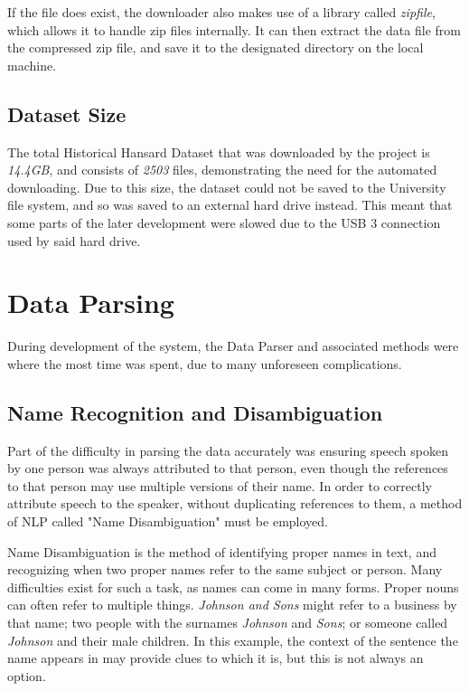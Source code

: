 If the file does exist, the downloader also makes use of a library called \emph{zipfile}, which allows it to handle zip files internally. It can then extract the data file from the compressed zip file, and save it to the designated directory on the local machine.

\subsection{Dataset Size}
\label{sec:imp_dataset_size}

The total Historical Hansard Dataset that was downloaded by the project is \emph{14.4GB}, and consists of \emph{2503} files, demonstrating the need for the automated downloading. Due to this size, the dataset could not be saved to the University file system, and so was saved to an external hard drive instead. This meant that some parts of the later development were slowed due to the USB 3 connection used by said hard drive. 

\section{Data Parsing}
\label{sec:imp_data_parse}
During development of the system, the Data Parser and associated methods were where the most time was spent, due to many unforeseen complications.
 
\subsection{Name Recognition and Disambiguation}
\label{sec:imp_name_disamb}
Part of the difficulty in parsing the data accurately was ensuring speech spoken by one person was always attributed to that person, even though the references to that person may use multiple versions of their name. In order to correctly attribute speech to the speaker, without duplicating references to them, a method of NLP called "Name Disambiguation" must be employed.

Name Disambiguation is the method of identifying proper names in text, and recognizing when two proper names refer to the same subject or person.\cite{Wacholder} Many difficulties exist for such a task, as names can come in many forms. Proper nouns can often refer to multiple things. \emph{Johnson and Sons} might refer to a business by that name; two people with the surnames \emph{Johnson} and \emph{Sons}; or someone called \emph{Johnson} and their male children. In this example, the context of the sentence the name appears in may provide clues to which it is, but this is not always an option.

